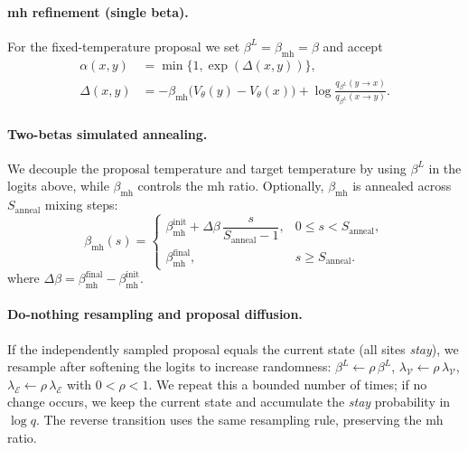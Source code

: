 \paragraph{\gls{mh} refinement (single beta).}
For the fixed-temperature proposal we set \(\beta^L=\beta_{\mathrm{mh}}=\beta\) and accept
\begin{equation}
\begin{aligned}
\alpha(x,y)
&=\min\{1,\exp(\Delta(x,y))\},\\
\Delta(x,y)
&=-\beta_{\mathrm{mh}}\big(V_\theta(y)-V_\theta(x)\big)
+\log\frac{q_{\beta^L}(y\to x)}{q_{\beta^L}(x\to y)}.
\end{aligned}
\end{equation}

\paragraph{Two-betas simulated annealing.}
We decouple the proposal temperature and target temperature by using
\(\beta^L\) in the logits above, while \(\beta_{\mathrm{mh}}\) controls the \gls{mh} ratio.
Optionally, \(\beta_{\mathrm{mh}}\) is annealed across $S_{\mathrm{anneal}}$ mixing steps:
\begin{equation}
\beta_{\mathrm{mh}}(s)=
\begin{cases}
\beta_{\mathrm{mh}}^{\mathrm{init}}+\Delta\beta\,\dfrac{s}{S_{\mathrm{anneal}}-1}, & 0\le s<S_{\mathrm{anneal}},\\[6pt]
\beta_{\mathrm{mh}}^{\mathrm{final}}, & s\ge S_{\mathrm{anneal}}.
\end{cases}
\end{equation}
where \(\Delta\beta=\beta_{\mathrm{mh}}^{\mathrm{final}}-\beta_{\mathrm{mh}}^{\mathrm{init}}\).

\paragraph{Do-nothing resampling and proposal diffusion.}
If the independently sampled proposal equals the current state (all sites \textit{stay}),
we resample after softening the logits to increase randomness:
\(\beta^L\leftarrow\rho\,\beta^L\),
\(\lambda_\mathcal{V}\leftarrow\rho\,\lambda_\mathcal{V}\),
\(\lambda_\mathcal{E}\leftarrow\rho\,\lambda_\mathcal{E}\) with \(0<\rho<1\).
We repeat this a bounded number of times; if no change occurs, we keep the current
state and accumulate the \textit{stay} probability in \(\log q\). The reverse
transition uses the same resampling rule, preserving the \gls{mh} ratio.
